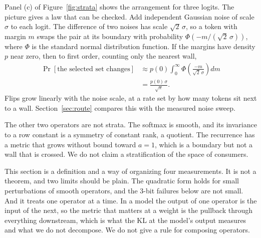 \documentclass[journal]{IEEEtran}
\begin{document}
Panel (c) of Figure~\ref{fig:strata} shows the arrangement for three logits. The picture gives a law that can
be checked. Add independent Gaussian noise of scale $\sigma$ to
each logit. The difference of two noises has scale $\sqrt2\,\sigma$, so a token with margin $m$
swaps the pair at its boundary with probability $\Phi(-m/(\sqrt2\,\sigma))$, where $\Phi$ is the
standard normal distribution function. If the margins have density $p$ near zero, then to first
order, counting only the nearest wall,
\begin{equation}
\begin{aligned}
\Pr[\text{the selected set changes}]
&\approx p(0)\int_0^\infty \Phi\!\left(\frac{-m}{\sqrt2\,\sigma}\right)dm\\
&= \frac{p(0)\,\sigma}{\sqrt\pi}.
\end{aligned}
\label{eq:tube}
\end{equation}
Flips grow linearly with the noise scale, at a rate set by how many tokens sit next to a wall.
Section~\ref{sec:route} compares this with the measured noise sweep.

The other two operators are not strata. The softmax is smooth, and its invariance to a row
constant is a symmetry of constant rank, a quotient. The recurrence has a metric that grows
without bound toward $a = 1$, which is a boundary but not a wall that is crossed. We do not claim
a stratification of the space of consumers.

This section is a definition and a way of organizing four measurements. It is not a theorem, and
two limits should be plain. The quadratic form holds for small perturbations of smooth operators, and
the 3-bit failures below are not small. And it treats one operator at a time. In a model the
output of one operator is the input of the next, so the metric that matters at a weight is the
pullback through everything downstream, which is what the KL at the model's output measures and
what we do not decompose. We do not give a rule for composing operators.
\end{document}

